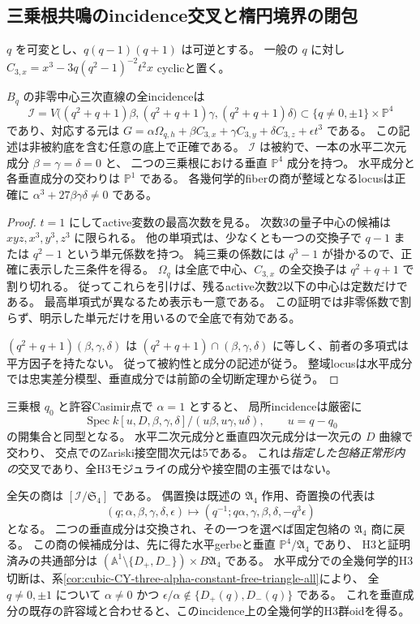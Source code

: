 \subsection{三乗根共鳴のincidence交叉と楕円境界の閉包}
\label{subsec:quantum-triangle-incidence}
$q$ を可変とし、$q(q-1)(q+1)$ は可逆とする。
一般の $q$ に対し $C_{3,x}=x^3-3q(q^2-1)^{-2}t^2x$ cyclicと置く。

\begin{proposition}[全基底上の中心三次incidence]
\label{prop:quantum-triangle-resonance}
$B_q$ の非零中心三次直線の全incidenceは
\[
 \mathcal I=V\bigl((q^2+q+1)\beta,
 (q^2+q+1)\gamma,(q^2+q+1)\delta\bigr)
 \subset\{q\ne0,\pm1\}\times\mathbb P^4
\]
であり、対応する元は
$G=\alpha\Omega_{q,h}+\beta C_{3,x}+\gamma C_{3,y}+\delta C_{3,z}+\epsilon t^3$ である。
この記述は非被約底を含む任意の底上で正確である。
$\mathcal I$ は被約で、一本の水平二次元成分 $\beta=\gamma=\delta=0$ と、
二つの三乗根における垂直 $\mathbb P^4$ 成分を持つ。
水平成分と各垂直成分の交わりは $\mathbb P^1$ である。
各幾何学的fiberの商が整域となるlocusは正確に
$\alpha^3+27\beta\gamma\delta\ne0$ である。
\end{proposition}
\begin{proof}
$t=1$ にしてactive変数の最高次数を見る。
次数3の量子中心の候補は $xyz,x^3,y^3,z^3$ に限られる。
他の単項式は、少なくとも一つの交換子で $q-1$ または $q^2-1$ という単元係数を持つ。
純三乗の係数には $q^3-1$ が掛かるので、正確に表示した三条件を得る。
$\Omega_q$ は全底で中心、$C_{3,x}$ の全交換子は $q^2+q+1$ で割り切れる。
従ってこれらを引けば、残るactive次数2以下の中心は定数だけである。
最高単項式が異なるため表示も一意である。
この証明では非零係数で割らず、明示した単元だけを用いるので全底で有効である。

$(q^2+q+1)(\beta,\gamma,\delta)$ は
$(q^2+q+1)\cap(\beta,\gamma,\delta)$ に等しく、前者の多項式は平方因子を持たない。
従って被約性と成分の記述が従う。
整域locusは水平成分では忠実差分模型、垂直成分では前節の全切断定理から従う。
\end{proof}

三乗根 $q_0$ と許容Casimir点で $\alpha=1$ とすると、
局所incidenceは厳密に
\[
 \operatorname{Spec}k[u,D,\beta,\gamma,\delta]/
 (u\beta,u\gamma,u\delta),\qquad u=q-q_0
\]
の開集合と同型となる。
水平二次元成分と垂直四次元成分は一次元の $D$ 曲線で交わり、
交点でのZariski接空間次元は5である。
これは\emph{指定した包絡正常形内の}交叉であり、全H3モジュライの成分や接空間の主張ではない。

全矢の商は $[\mathcal I/\mathfrak S_4]$ である。
偶置換は既述の $\mathfrak A_4$ 作用、奇置換の代表は
\[
 (q;\alpha,\beta,\gamma,\delta,\epsilon)
 \longmapsto(q^{-1};q\alpha,\gamma,\beta,\delta,-q^3\epsilon)
\]
となる。
二つの垂直成分は交換され、その一つを選べば固定包絡の $\mathfrak A_4$ 商に戻る。
この商の候補成分は、先に得た水平gerbeと垂直 $\mathbb P^4/\mathfrak A_4$ であり、
H3と証明済みの共通部分は
$(\mathbb A^1\setminus\{D_+,D_-\})\times B\mathfrak A_4$ である。
水平成分での全幾何学的H3切断は、系\ref{cor:cubic-CY-three-alpha-constant-free-triangle-all}により、
全 $q\ne0,\pm1$ について $\alpha\ne0$ かつ
$\epsilon/\alpha\notin\{D_+(q),D_-(q)\}$ である。
これを垂直成分の既存の許容域と合わせると、このincidence上の全幾何学的H3群oidを得る。

